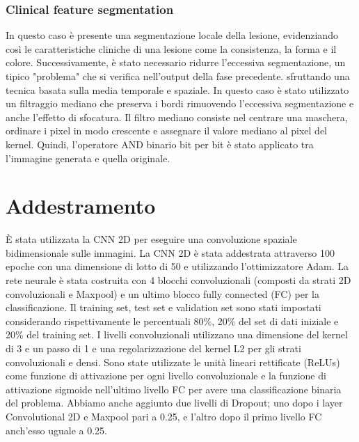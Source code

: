 {\subsubsection{Clinical feature segmentation}
In questo caso è presente una segmentazione locale della lesione, evidenziando così le caratteristiche cliniche di una lesione come la consistenza, la forma e il colore.
\newline
Successivamente, è stato necessario ridurre l'eccessiva segmentazione, un tipico "problema" che si verifica nell'output della fase precedente. sfruttando una tecnica basata sulla media temporale e spaziale. In questo caso è stato utilizzato un filtraggio mediano che preserva i bordi rimuovendo l'eccessiva segmentazione e anche l'effetto di sfocatura.
\newline
Il filtro mediano consiste nel centrare una maschera, ordinare i pixel in modo crescente e assegnare il valore mediano al pixel del kernel.
\newline
Quindi, l'operatore AND binario bit per bit è stato applicato tra l'immagine generata e quella originale.
\newpage
\section{Addestramento}
È stata utilizzata la CNN 2D per eseguire una convoluzione spaziale bidimensionale sulle immagini. 
\newline
La CNN 2D è stata addestrata attraverso 100 epoche con una dimensione di lotto di 50 e utilizzando l'ottimizzatore Adam. 
La rete neurale è stata costruita con 4 blocchi convoluzionali (composti da strati 2D convoluzionali e Maxpool) e un ultimo blocco fully connected (FC) per la classificazione. 
\newline
Il training set, test set e validation set sono stati impostati considerando rispettivamente le percentuali 80\%, 20\% del set di dati iniziale e 20\% del training set.
\newline
I livelli convoluzionali utilizzano una dimensione del kernel di 3 e un passo di 1 e una regolarizzazione del kernel L2 per gli strati convoluzionali e densi. Sono state utilizzate le unità lineari rettificate (ReLUs) come funzione di attivazione per ogni livello convoluzionale e la funzione di attivazione sigmoide nell'ultimo livello FC per avere una classificazione binaria del problema. 
\newline
Abbiamo anche aggiunto due livelli di Dropout; uno dopo i layer Convolutional 2D e Maxpool pari a 0.25, e l'altro dopo il primo livello FC anch'esso uguale a 0.25.
}
